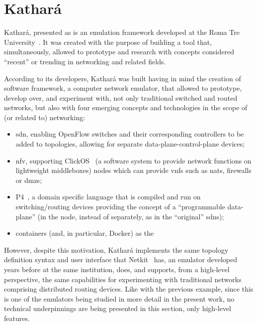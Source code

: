 \section{Kathará}
\label{sec:exemulkathara}

Kathará, presented as  is an emulation framework developed at the Roma Tre University~\cite{kathara}.
It was created with the purpose of building a tool that, simultaneously, allowed to prototype and research with concepts considered ``recent'' or trending in networking and related fields.

According to its developers, Kathará was built having in mind the creation of software framework, a computer network emulator, that allowed to prototype, develop over, and experiment with, not only traditional switched and routed networks, but also with four emerging concepts and technologies in the scope of (or related to) networking:
\begin{itemize}
	\item \gls{sdn}, enabling OpenFlow switches and their corresponding controllers to be added to topologies, allowing for separate data-plane-control-plane devices;
	\item \gls{nfv}, supporting ClickOS~\cite{clickos} (a software system to provide network functions on lightweight middleboxes) nodes which can provide \glspl{vnf} such as \glspl{nat}, firewalls or \glspl{dmz};
	\item P4~\cite{p4programming}, a domain specific language that is compiled and run on switching/routing devices providing the concept of a ``programmable data-plane'' (in the node, instead of separately, as in the ``original'' \glspl{sdn});
	\item containers (and, in particular, Docker) as the 
\end{itemize}

However, despite this motivation, Kathará implements the same topology definition syntax and user interface that Netkit~\cite{netkit-short} has, an emulator developed years before at the same institution, does, and supports, from a high-level perspective, the same capabilities for experimenting with traditional networks comprising distributed routing devices.
Like with the previous example, since this is one of the emulators being studied in more detail in the present work, no technical underpinnings are being presented in this section, only high-level features.

